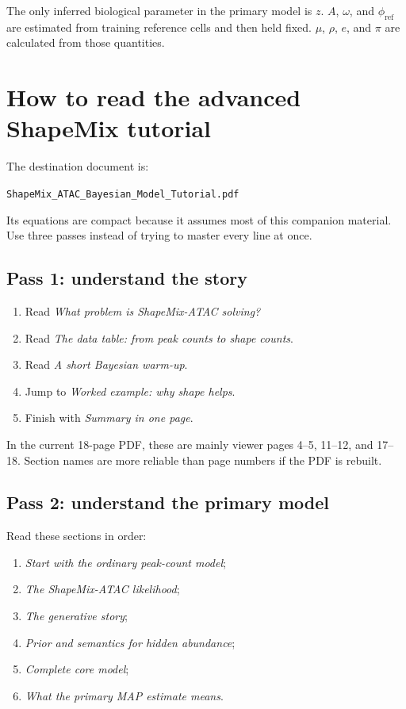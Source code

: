 \documentclass[11pt]{article}
\begin{document}
\begin{bigidea}
The only inferred biological parameter in the primary model is \(z\).
\(A\), \(\omega\), and \(\phi_{\mathrm{ref}}\) are estimated from training
reference cells and then held fixed. \(\mu\), \(\rho\), \(e\), and \(\pi\) are
calculated from those quantities.
\end{bigidea}

\section{How to read the advanced ShapeMix tutorial}

The destination document is:

\begin{center}
\texttt{ShapeMix\_ATAC\_Bayesian\_Model\_Tutorial.pdf}
\end{center}

Its equations are compact because it assumes most of this companion material.
Use three passes instead of trying to master every line at once.

\subsection{Pass 1: understand the story}

\begin{enumerate}[leftmargin=2em]
  \item Read \emph{What problem is ShapeMix-ATAC solving?}
  \item Read \emph{The data table: from peak counts to shape counts}.
  \item Read \emph{A short Bayesian warm-up}.
  \item Jump to \emph{Worked example: why shape helps}.
  \item Finish with \emph{Summary in one page}.
\end{enumerate}

In the current 18-page PDF, these are mainly viewer pages 4--5, 11--12, and
17--18. Section names are more reliable than page numbers if the PDF is rebuilt.

\subsection{Pass 2: understand the primary model}

Read these sections in order:

\begin{enumerate}[leftmargin=2em]
  \item \emph{Start with the ordinary peak-count model};
  \item \emph{The ShapeMix-ATAC likelihood};
  \item \emph{The generative story};
  \item \emph{Prior and semantics for hidden abundance};
  \item \emph{Complete core model};
  \item \emph{What the primary MAP estimate means}.
\end{enumerate}
\end{document}
